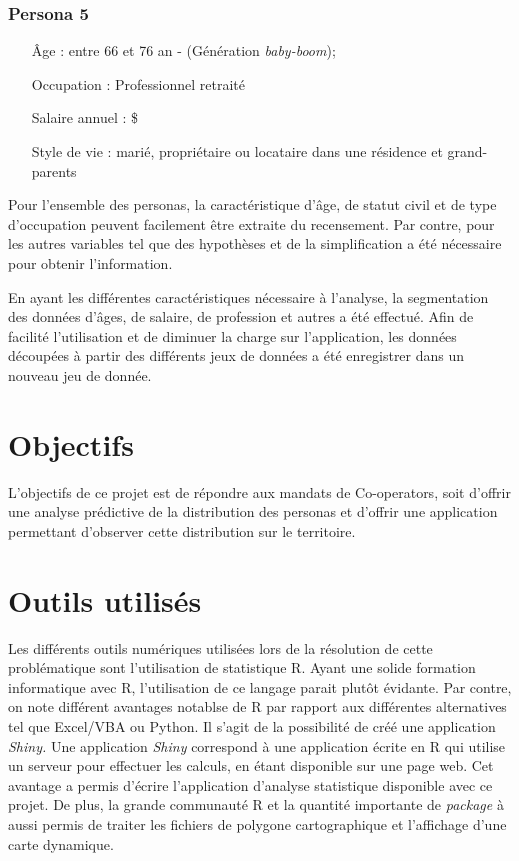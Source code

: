 \documentclass[11pt,french]{report}\usepackage[]{graphicx}\usepackage[]{color}
\begin{document}
\subsubsection*{Persona 5}
\label{per5}
\begin{itemize}
\item[Âge :] entre 66 et 76 an - (Génération \emph{baby-boom});
\item[Occupation :] Professionnel retraité
\item[Salaire annuel :]  \$
\item[Style de vie : ] marié, propriétaire ou locataire dans une résidence et grand-parents
\end{itemize}
\bigskip

Pour l'ensemble des personas, la caractéristique d'âge, de statut civil et de type d'occupation peuvent facilement être extraite du recensement. Par contre, pour les autres variables tel que  des hypothèses et de la simplification a été nécessaire pour obtenir l'information.
\newline

En ayant les différentes caractéristiques nécessaire à l'analyse, la segmentation des données d'âges, de salaire, de profession et autres a été effectué. Afin de facilité l'utilisation et de diminuer la charge sur l'application, les données découpées à partir des différents jeux de données a été enregistrer dans un nouveau jeu de donnée. 

\section*{Objectifs}
L'objectifs de ce projet est de répondre aux mandats de Co-operators, soit d'offrir une analyse prédictive de la distribution des personas et d'offrir une application permettant d'observer cette distribution sur le territoire.

\section*{Outils utilisés}

Les différents outils numériques utilisées lors de la résolution de cette problématique sont l'utilisation de statistique R. Ayant une solide formation informatique avec R, l'utilisation de ce langage parait plutôt évidante. Par contre, on note différent avantages notablse de R par rapport aux différentes alternatives tel que Excel/VBA ou Python. Il s'agit de la possibilité de créé une application \emph{Shiny.} Une application \emph{Shiny} correspond à une application écrite en R qui utilise un serveur pour effectuer les calculs, en étant disponible sur une page web. Cet avantage a permis d'écrire  l'application d'analyse statistique disponible avec ce projet. De plus, la grande communauté R et la quantité importante de \emph{package} à aussi permis de traiter les fichiers de polygone cartographique et l'affichage d'une carte dynamique. 
\end{document}
